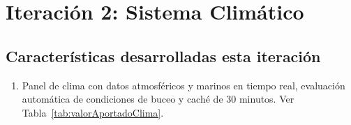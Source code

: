 \chapter{Iteración 2: Sistema Climático}

\begin{abstract}
Esta iteración añade la segunda parte del MVP de Scubex: El panel de condiciones meteorológicas y marinas, el usuario puede consultar en tiempo real si una zona es apta o no para bucear antes de meterse al agua.\end{abstract}

\section{Características desarrolladas esta iteración}

\begin{enumerate}
\item Panel de clima con datos atmosféricos y marinos en tiempo real, evaluación automática de condiciones de buceo y caché de 30 minutos. Ver Tabla~\ref{tab:valorAportadoClima}.
\end{enumerate}

